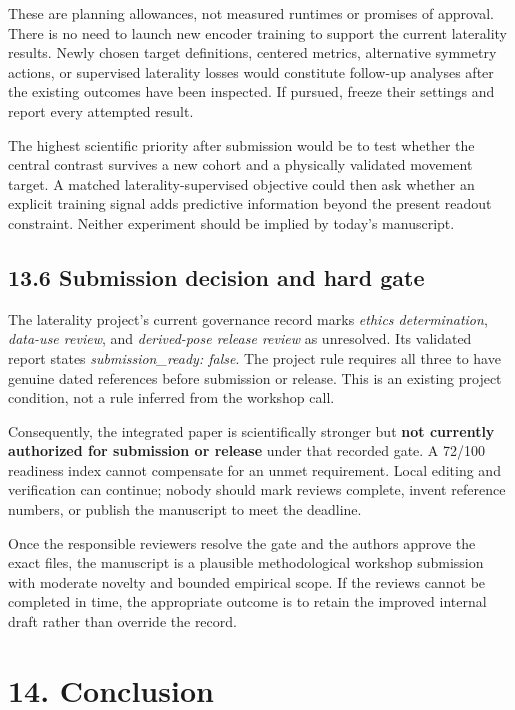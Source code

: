 \documentclass[11pt,letterpaper]{article}
\begin{document}
These are planning allowances, not measured runtimes or promises of
approval. There is no need to launch new encoder training to support the
current laterality results. Newly chosen target definitions, centered
metrics, alternative symmetry actions, or supervised laterality losses
would constitute follow-up analyses after the existing outcomes have
been inspected. If pursued, freeze their settings and report every
attempted result.

The highest scientific priority after submission would be to test
whether the central contrast survives a new cohort and a physically
validated movement target. A matched laterality-supervised objective
could then ask whether an explicit training signal adds predictive
information beyond the present readout constraint. Neither experiment
should be implied by today's manuscript.

\subsection{13.6 Submission decision and hard
gate}\label{submission-decision-and-hard-gate}

The laterality project's current governance record marks \emph{ethics
determination}, \emph{data-use review}, and \emph{derived-pose release
review} as unresolved. Its validated report states
\emph{submission\_ready: false}. The project rule requires all three to
have genuine dated references before submission or release. This is an
existing project condition, not a rule inferred from the workshop call.

Consequently, the integrated paper is scientifically stronger but
\textbf{not currently authorized for submission or release} under that
recorded gate. A 72/100 readiness index cannot compensate for an unmet
requirement. Local editing and verification can continue; nobody should
mark reviews complete, invent reference numbers, or publish the
manuscript to meet the deadline.

Once the responsible reviewers resolve the gate and the authors approve
the exact files, the manuscript is a plausible methodological workshop
submission with moderate novelty and bounded empirical scope. If the
reviews cannot be completed in time, the appropriate outcome is to
retain the improved internal draft rather than override the record.


\section{14. Conclusion}\label{conclusion}
\end{document}
